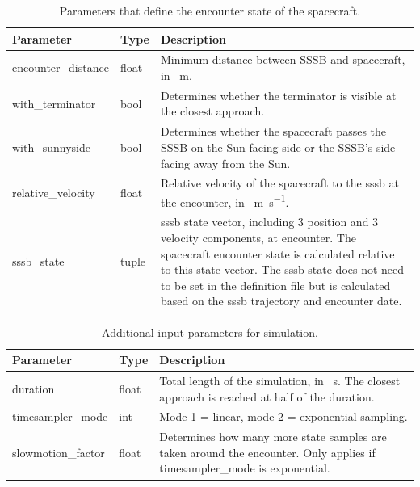 \begin{table}[htb]
    \centering
    \caption{Parameters that define the encounter state of the spacecraft.}
    \label{tab:sc_enc_paras}
    \begin{tabular}{p{}|p{}|p{}}
        \textbf{Parameter}  & \textbf{Type} & \textbf{Description} \\ \hline
        encounter\_distance & float         & Minimum distance between SSSB and spacecraft, in \SI{}{\meter}. \\
        with\_terminator    & bool          & Determines whether the terminator is visible at the closest approach. \\
        with\_sunnyside     & bool          & Determines whether the spacecraft passes the SSSB on the Sun facing side or the SSSB's side facing away from the Sun. \\
        relative\_velocity  & float         & Relative velocity of the spacecraft to the \gls{sssb} at the encounter, in \SI{}{\meter\per\second}. \\
        sssb\_state         & tuple         & \gls{sssb} state vector, including 3 position and 3 velocity components, at encounter. The spacecraft encounter state is calculated relative to this state vector. The \gls{sssb} state does not need to be set in the  definition file but is calculated based on the \gls{sssb} trajectory and encounter date.
    \end{tabular}
\end{table}

\begin{table}[htb]
    \centering
    \caption{Additional input parameters for simulation.}
    \label{tab:sim_input_params}
    \begin{tabular}{p{}|p{}|p{}}
        \textbf{Parameter}  & \textbf{Type} & \textbf{Description} \\ \hline
        duration            & float         & Total length of the simulation, in \SI{}{\second}. The closest approach is reached at half of the duration. \\
        timesampler\_mode   & int           & Mode 1 = linear, mode 2 = exponential sampling.  \\
        slowmotion\_factor  & float         & Determines how many more state samples are taken around the encounter. Only applies if timesampler\_mode is exponential. \\
    \end{tabular}
\end{table}

